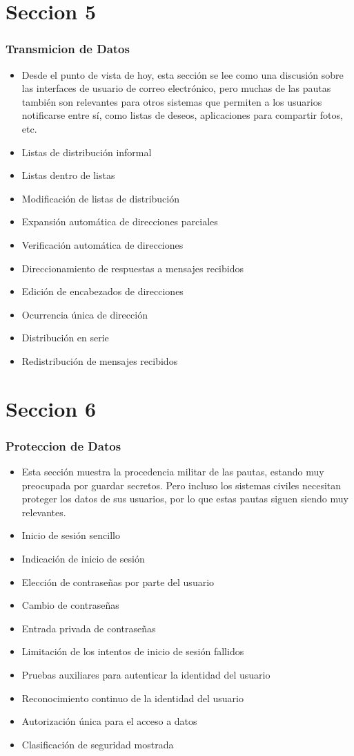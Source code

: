 \documentclass[11pt]{beamer}
\begin{document}
\section{Seccion 5}
\begin{frame}
\frametitle{Transmicion de Datos}
\begin{itemize}
\item Desde el punto de vista de hoy, esta sección se lee como una discusión sobre las interfaces de usuario de correo electrónico, pero muchas de las pautas también son relevantes para otros sistemas que permiten a los usuarios notificarse entre sí, como listas de deseos, aplicaciones para compartir fotos, etc.
\item Listas de distribución informal
\item Listas dentro de listas
\item Modificación de listas de distribución
\item Expansión automática de direcciones parciales
\item Verificación automática de direcciones
\item Direccionamiento de respuestas a mensajes recibidos
\item Edición de encabezados de direcciones
\item Ocurrencia única de dirección
\item Distribución en serie
\item Redistribución de mensajes recibidos
\end{itemize}
\end{frame}

\section{Seccion 6}
\begin{frame}
\frametitle{Proteccion de Datos}
\begin{itemize}
\item Esta sección muestra la procedencia militar de las pautas, estando muy preocupada por guardar secretos. Pero incluso los sistemas civiles necesitan proteger los datos de sus usuarios, por lo que estas pautas siguen siendo muy relevantes.
\item Inicio de sesión sencillo
\item Indicación de inicio de sesión
\item Elección de contraseñas por parte del usuario
\item Cambio de contraseñas
\item Entrada privada de contraseñas
\item Limitación de los intentos de inicio de sesión fallidos
\item Pruebas auxiliares para autenticar la identidad del usuario
\item Reconocimiento continuo de la identidad del usuario
\item Autorización única para el acceso a datos
\item Clasificación de seguridad mostrada
\end{itemize}
\end{frame}
\end{document}
